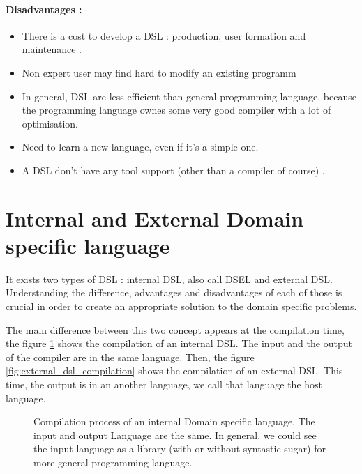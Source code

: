 \paragraph{Disadvantages \cite{vandeursenarieklintpaulvisserjoost2000}:}
\begin{itemize}
\item There is a cost to develop a DSL : production, user formation and
  maintenance .
\item Non expert user may find hard to modify an existing programm
\item In general, DSL are less efficient than general programming language,
  because the programming language ownes some very good compiler with a lot of
  optimisation.
\item Need to learn a new language, even if it's a simple one.
\item A DSL don't have any tool support (other than a compiler of course) \cite{mernikmarjanheeringjansloaneanthonym.2005}.
\end{itemize}

\section{Internal and External Domain specific language}
\label{sec:internal_and_external_dsl}

It exists two types of \gls{DSL} : internal \gls{DSL}, also call \gls{DSEL} and
external DSL. Understanding the difference, advantages and disadvantages of each
of those is crucial in order to create an appropriate solution to the domain
specific problems.

The main difference between this two concept appears at the compilation time,
the figure \ref{fig:internal_dsl_compilation} shows the compilation of an
internal DSL. The input and the output of the compiler are in the same language.
Then, the figure \ref{fig:external_dsl_compilation} shows the compilation of an
external DSL. This time, the output is in an another language, we call that
language the host language.

\begin{figure}[ht]
  \centering
  \caption[Compilation process of an internal \gls{DSL}]{Compilation process of
    an internal Domain specific language. The input and output Language are the
    same. In general, we could see the input language as a library (with or
    without syntastic sugar) for more general programming language.}
  \label{fig:internal_dsl_compilation}
\end{figure}

